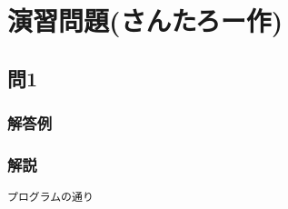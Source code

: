 \section{演習問題(さんたろー作)}
\subsection{問1}
\subsubsection{解答例}

\subsubsection{解説}
\begin{verbatim}
プログラムの通り
\end{verbatim}
